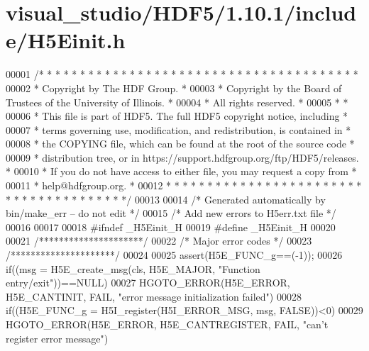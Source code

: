 \hypertarget{visual__studio_2_h_d_f5_21_810_81_2include_2_h5_einit_8h_source}{}\section{visual\+\_\+studio/\+H\+D\+F5/1.10.1/include/\+H5\+Einit.h}
\label{visual__studio_2_h_d_f5_21_810_81_2include_2_h5_einit_8h_source}

\begin{DoxyCode}
00001 \textcolor{comment}{/* * * * * * * * * * * * * * * * * * * * * * * * * * * * * * * * * * * * * * *}
00002 \textcolor{comment}{ * Copyright by The HDF Group.                                               *}
00003 \textcolor{comment}{ * Copyright by the Board of Trustees of the University of Illinois.         *}
00004 \textcolor{comment}{ * All rights reserved.                                                      *}
00005 \textcolor{comment}{ *                                                                           *}
00006 \textcolor{comment}{ * This file is part of HDF5.  The full HDF5 copyright notice, including     *}
00007 \textcolor{comment}{ * terms governing use, modification, and redistribution, is contained in    *}
00008 \textcolor{comment}{ * the COPYING file, which can be found at the root of the source code       *}
00009 \textcolor{comment}{ * distribution tree, or in https://support.hdfgroup.org/ftp/HDF5/releases.  *}
00010 \textcolor{comment}{ * If you do not have access to either file, you may request a copy from     *}
00011 \textcolor{comment}{ * help@hdfgroup.org.                                                        *}
00012 \textcolor{comment}{ * * * * * * * * * * * * * * * * * * * * * * * * * * * * * * * * * * * * * * */}
00013 
00014 \textcolor{comment}{/* Generated automatically by bin/make\_err -- do not edit */}
00015 \textcolor{comment}{/* Add new errors to H5err.txt file */}
00016 
00017 
00018 \textcolor{preprocessor}{#ifndef \_H5Einit\_H}
00019 \textcolor{preprocessor}{#define \_H5Einit\_H}
00020 
00021 \textcolor{comment}{/*********************/}
00022 \textcolor{comment}{/* Major error codes */}
00023 \textcolor{comment}{/*********************/}
00024 
00025 assert(H5E\_FUNC\_g==(-1));
00026 \textcolor{keywordflow}{if}((msg = H5E\_create\_msg(cls, H5E\_MAJOR, \textcolor{stringliteral}{"Function entry/exit"}))==NULL)
00027     HGOTO\_ERROR(H5E\_ERROR, H5E\_CANTINIT, FAIL, \textcolor{stringliteral}{"error message initialization failed"})
00028 if((H5E\_FUNC\_g = H5I\_register(H5I\_ERROR\_MSG, msg, FALSE))<0)
00029     HGOTO\_ERROR(H5E\_ERROR, H5E\_CANTREGISTER, FAIL, "can't register error message")

\end{DoxyCode}
